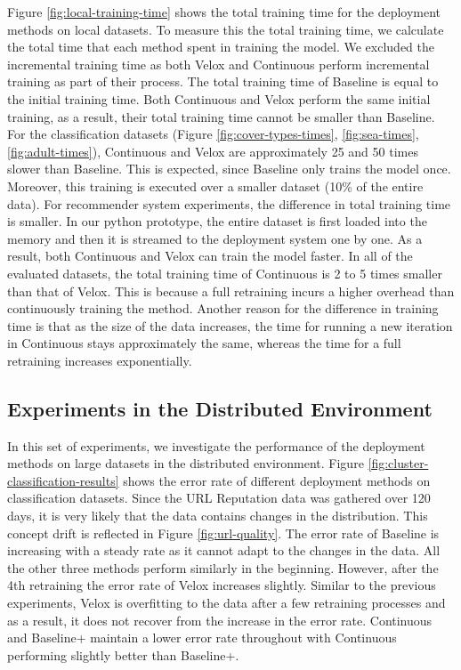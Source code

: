 \documentclass[10pt,conference,letterpaper]{IEEEtran}
\begin{document}
Figure \ref{fig:local-training-time} shows the total training time for the deployment methods on local datasets.
To measure this the total training time, we calculate the total time that each method spent in training the model.
We excluded the incremental training time as both Velox and Continuous perform incremental training as part of their process.
The total training time of Baseline is equal to the initial training time.
Both Continuous and Velox perform the same initial training, as a result, their total training time cannot be smaller than Baseline.
For the classification datasets (Figure \ref{fig:cover-types-times}, \ref{fig:sea-times}, \ref{fig:adult-times}), Continuous and Velox are approximately 25 and 50 times slower than Baseline.
This is expected, since Baseline only trains the model once.
Moreover, this training is executed over a smaller dataset (10\% of the entire data).
For recommender system experiments, the difference in total training time is smaller.
In our python prototype, the entire dataset is first loaded into the memory and then it is streamed to the deployment system one by one.
As a result, both Continuous and Velox can train the model faster.
In all of the evaluated datasets, the total training time of Continuous is 2 to 5 times smaller than that of Velox.
This is because a full retraining incurs a higher overhead than continuously training the method.
Another reason for the difference in training time is that as the size of the data increases, the time for running a new iteration in Continuous stays approximately the same, whereas the time for a full retraining increases exponentially.

\subsection{Experiments in the Distributed Environment}
In this set of experiments, we investigate the performance of the deployment methods on large datasets in the distributed environment.
Figure \ref{fig:cluster-classification-results} shows the error rate of different deployment methods on classification datasets.
Since the URL Reputation data was gathered over 120 days, it is very likely that the data contains changes in the distribution.
This concept drift is reflected in Figure \ref{fig:url-quality}.
The error rate of Baseline is increasing with a steady rate as it cannot adapt to the changes in the data.
All the other three methods perform similarly in the beginning.
However, after the 4th retraining the error rate of Velox increases slightly.
Similar to the previous experiments, Velox is overfitting to the data after a few retraining processes and as a result, it does not recover from the increase in the error rate.
Continuous and Baseline+ maintain a lower error rate throughout with Continuous performing slightly better than Baseline+.
\end{document}
